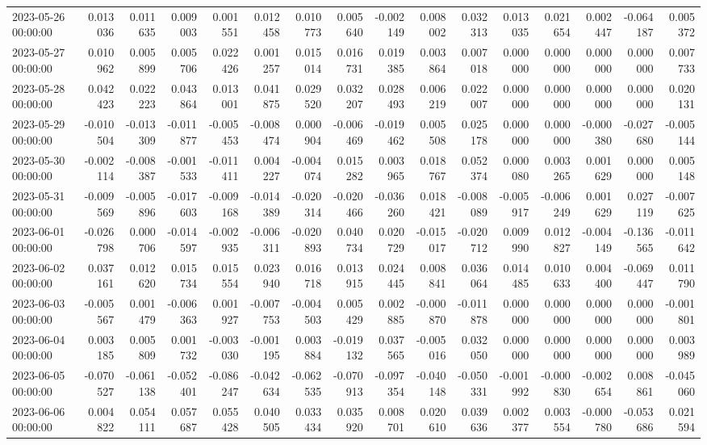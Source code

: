 \begin{tabular}{lrrrrrrrrrrrrrrr}
2023-05-26 00:00:00 & 0.013036 & 0.011635 & 0.009003 & 0.001551 & 0.012458 & 0.010773 & 0.005640 & -0.002149 & 0.008002 & 0.032313 & 0.013035 & 0.021654 & 0.002447 & -0.064187 & 0.005372 \\
2023-05-27 00:00:00 & 0.010962 & 0.005899 & 0.005706 & 0.022426 & 0.001257 & 0.015014 & 0.016731 & 0.019385 & 0.003864 & 0.007018 & 0.000000 & 0.000000 & 0.000000 & 0.000000 & 0.007733 \\
2023-05-28 00:00:00 & 0.042423 & 0.022223 & 0.043864 & 0.013001 & 0.041875 & 0.029520 & 0.032207 & 0.028493 & 0.006219 & 0.022007 & 0.000000 & 0.000000 & 0.000000 & 0.000000 & 0.020131 \\
2023-05-29 00:00:00 & -0.010504 & -0.013309 & -0.011877 & -0.005453 & -0.008474 & 0.000904 & -0.006469 & -0.019462 & 0.005508 & 0.025178 & 0.000000 & 0.000000 & -0.000380 & -0.027680 & -0.005144 \\
2023-05-30 00:00:00 & -0.002114 & -0.008387 & -0.001533 & -0.011411 & 0.004227 & -0.004074 & 0.015282 & 0.003965 & 0.018767 & 0.052374 & 0.000080 & 0.003265 & 0.001629 & 0.000000 & 0.005148 \\
2023-05-31 00:00:00 & -0.009569 & -0.005896 & -0.017603 & -0.009168 & -0.014389 & -0.020314 & -0.020466 & -0.036260 & 0.018421 & -0.008089 & -0.005917 & -0.006249 & 0.001629 & 0.027119 & -0.007625 \\
2023-06-01 00:00:00 & -0.026798 & 0.000706 & -0.014597 & -0.002935 & -0.006311 & -0.020893 & 0.040734 & 0.020729 & -0.015017 & -0.020712 & 0.009990 & 0.012827 & -0.004149 & -0.136565 & -0.011642 \\
2023-06-02 00:00:00 & 0.037161 & 0.012620 & 0.015734 & 0.015554 & 0.023940 & 0.016718 & 0.013915 & 0.024445 & 0.008841 & 0.036064 & 0.014485 & 0.010633 & 0.004400 & -0.069447 & 0.011790 \\
2023-06-03 00:00:00 & -0.005567 & 0.001479 & -0.006363 & 0.001927 & -0.007753 & -0.004503 & 0.005429 & 0.002885 & -0.000870 & -0.011878 & 0.000000 & 0.000000 & 0.000000 & 0.000000 & -0.001801 \\
2023-06-04 00:00:00 & 0.003185 & 0.005809 & 0.001732 & -0.003030 & -0.001195 & 0.003884 & -0.019132 & 0.037565 & -0.005016 & 0.032050 & 0.000000 & 0.000000 & 0.000000 & 0.000000 & 0.003989 \\
2023-06-05 00:00:00 & -0.070527 & -0.061138 & -0.052401 & -0.086247 & -0.042634 & -0.062535 & -0.070913 & -0.097354 & -0.040148 & -0.050331 & -0.001992 & -0.000830 & -0.002654 & 0.008861 & -0.045060 \\
2023-06-06 00:00:00 & 0.004822 & 0.054111 & 0.057687 & 0.055428 & 0.040505 & 0.033434 & 0.035920 & 0.008701 & 0.020610 & 0.039636 & 0.002377 & 0.003554 & -0.000780 & -0.053686 & 0.021594 \\

\end{tabular}
